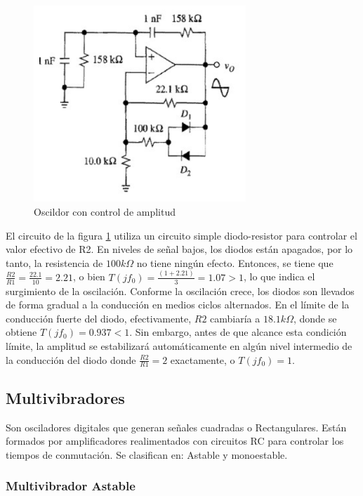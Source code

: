         \begin{figure}[H]
            \centering
            \includegraphics[width=8cm]{Imagenes/4.png}
            \caption{Oscildor con control de amplitud}
            \label{fig:4}
        \end{figure}

        El circuito de la figura \ref{fig:4} utiliza un circuito simple diodo-resistor para controlar el valor efectivo de R2. En niveles de señal bajos, los diodos están apagados, por lo tanto, la resistencia de \(100k\Omega\) no tiene ningún efecto. Entonces, se tiene que \(\frac{R2}{R1} = \frac{22.1}{10} = 2.21\), o bien \(T(jf_0) = \frac{(1 + 2.21)}{3} = 1.07 > 1\), lo que indica el surgimiento de la oscilación. Conforme la oscilación crece, los diodos son llevados de forma gradual a la conducción en medios ciclos alternados. En el límite de la conducción fuerte del diodo, efectivamente, \(R2\) cambiaría a \(18.1k\Omega\), donde se obtiene \(T(jf_0) = 0.937 < 1\). Sin embargo, antes de que alcance esta condición límite, la amplitud se estabilizará automáticamente en algún nivel intermedio de la conducción del diodo donde \(\frac{R2}{R1} = 2\) exactamente, o \(T(jf_0) = 1\).

        \subsection{Multivibradores}

            Son osciladores digitales que generan señales cuadradas o Rectangulares. Están formados por amplificadores realimentados con circuitos RC para controlar los tiempos de conmutación. Se clasifican en: Astable y monoestable.

            \subsubsection*{Multivibrador Astable}


